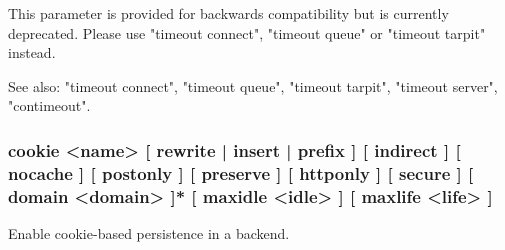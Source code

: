   This parameter is provided for backwards compatibility but is currently
  deprecated. Please use "timeout connect", "timeout queue" or "timeout tarpit"
  instead.

  See also: "timeout connect", "timeout queue", "timeout tarpit",
             "timeout server", "contimeout".


\subsubsection[cookie]{cookie <name> [ rewrite | insert | prefix ] [ indirect ]  [ nocache ] [ postonly ] [ preserve ] [ httponly ] [ secure ] [ domain <domain> ]* [ maxidle <idle> ] [ maxlife <life> ]}
  Enable cookie-based persistence in a backend.
  
  

